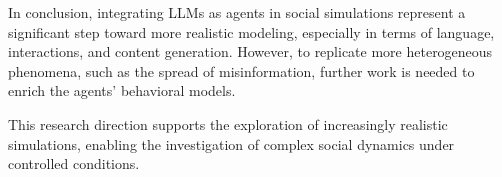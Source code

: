 \medskip
In conclusion, integrating LLMs as agents in social simulations represent a significant step toward more realistic modeling, especially in terms of language, interactions, and content generation.
However, to replicate more heterogeneous phenomena, such as the spread of misinformation, further work is needed to enrich the agents' behavioral models.

This research direction supports the exploration of increasingly realistic simulations, enabling the investigation of complex social dynamics under controlled conditions. 
